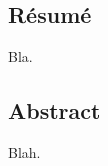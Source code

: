 \documentclass[final]{mpg-preth}
\begin{document}
\subsection*{Résumé}

Bla.

\subsection*{Abstract}

Blah.
\end{document}
